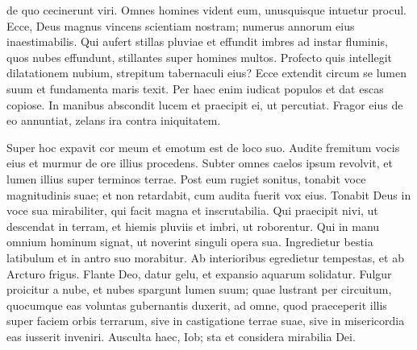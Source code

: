 \begin{biblechapter}
\begin{biblechapter}
\begin{biblechapter}
\begin{biblechapter}
\begin{biblechapter}
\begin{biblechapter}
\begin{biblechapter}
\begin{biblechapter}
\begin{biblechapter}
\begin{biblechapter}
\begin{biblechapter}
\begin{biblechapter}
\begin{biblechapter}
\begin{biblechapter}
\begin{biblechapter}
\begin{biblechapter}
\begin{biblechapter}
\begin{biblechapter}
\begin{biblechapter}
\begin{biblechapter}
\begin{biblechapter}
\begin{biblechapter}
\begin{biblechapter}
\begin{biblechapter}
\begin{biblechapter}
\begin{biblechapter}
\begin{biblechapter}
\begin{biblechapter}
\begin{biblechapter}
\begin{biblechapter}
\begin{biblechapter}
\begin{biblechapter}
\begin{biblechapter}
\begin{biblechapter}
\begin{biblechapter}
\begin{biblechapter}
 de quo cecinerunt viri.
 \verse Omnes homines vident eum,
 unusquisque intuetur procul.
 \verse Ecce, Deus magnus vincens scientiam nostram;
 numerus annorum eius inaestimabilis.
 \verse Qui aufert stillas pluviae
 et effundit imbres ad instar fluminis,
 \verse quos nubes effundunt,
 stillantes super homines multos.
 \verse Profecto quis intellegit dilatationem nubium,
 strepitum tabernaculi eius?
 \verse Ecce extendit circum se lumen suum
 et fundamenta maris texit.
 \verse Per haec enim iudicat populos
 et dat escas copiose.
 \verse In manibus abscondit lucem
 et praecipit ei, ut percutiat.
 \verse Fragor eius de eo annuntiat,
 zelans ira contra iniquitatem.
 
\begin{biblechapter}
\verse Super hoc expavit cor meum
 et emotum est de loco suo.
 \verse Audite fremitum vocis eius
 et murmur de ore illius procedens.
 \verse Subter omnes caelos ipsum revolvit,
 et lumen illius super terminos terrae.
 \verse Post eum rugiet sonitus,
 tonabit voce magnitudinis suae;
 et non retardabit, cum audita fuerit vox eius.
 \verse Tonabit Deus in voce sua mirabiliter,
 qui facit magna et inscrutabilia.
 \verse Qui praecipit nivi, ut descendat in terram,
 et hiemis pluviis et imbri, ut roborentur.
 \verse Qui in manu omnium hominum signat,
 ut noverint singuli opera sua.
 \verse Ingredietur bestia latibulum
 et in antro suo morabitur.
 \verse Ab interioribus egredietur tempestas,
 et ab Arcturo frigus.
 \verse Flante Deo, datur gelu,
 et expansio aquarum solidatur.
 \verse Fulgur proicitur a nube,
 et nubes spargunt lumen suum;
 \verse quae lustrant per circuitum,
 quocumque eas voluntas gubernantis duxerit,
 ad omne, quod praeceperit illis super faciem orbis terrarum,
 \verse sive in castigatione terrae suae,
 sive in misericordia eas iusserit inveniri.
 \verse Ausculta haec, Iob;
 sta et considera mirabilia Dei.

\end{biblechapter}
\end{biblechapter}
\end{biblechapter}
\end{biblechapter}
\end{biblechapter}
\end{biblechapter}
\end{biblechapter}
\end{biblechapter}
\end{biblechapter}
\end{biblechapter}
\end{biblechapter}
\end{biblechapter}
\end{biblechapter}
\end{biblechapter}
\end{biblechapter}
\end{biblechapter}
\end{biblechapter}
\end{biblechapter}
\end{biblechapter}
\end{biblechapter}
\end{biblechapter}
\end{biblechapter}
\end{biblechapter}
\end{biblechapter}
\end{biblechapter}
\end{biblechapter}
\end{biblechapter}
\end{biblechapter}
\end{biblechapter}
\end{biblechapter}
\end{biblechapter}
\end{biblechapter}
\end{biblechapter}
\end{biblechapter}
\end{biblechapter}
\end{biblechapter}
\end{biblechapter}
